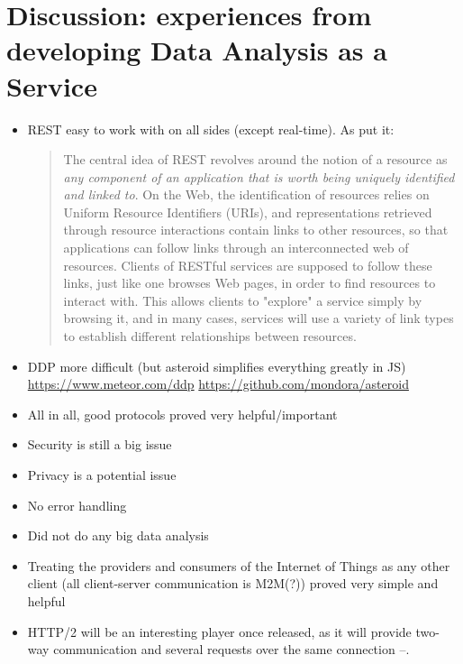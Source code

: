 \section{Discussion: experiences from developing Data Analysis as a Service}
\begin{itemize}
    \item REST easy to work with on all sides (except real-time). As     \textcite{uckelmann-harrison-michahelles:architecting-the-internet-of-things:2011} put it:

    \blockquote{The central idea of REST revolves around the notion of a resource as \textit{any component of an application that is worth being uniquely identified and linked to}. On the Web, the identification of resources relies on Uniform Resource Identifiers (URIs), and representations retrieved through resource interactions contain links to other resources, so that applications can follow links through an interconnected web of resources. Clients of RESTful services are supposed to follow these links, just like one browses Web pages, in order to find resources to interact with. This allows clients to "explore" a service simply by browsing it, and in many cases, services will use a variety of link types to establish different relationships between resources.}

    \item DDP more difficult (but asteroid simplifies everything greatly in JS) \url{https://www.meteor.com/ddp} \url{https://github.com/mondora/asteroid}
    \item All in all, good protocols proved very helpful/important
    \item Security is still a big issue
    \item Privacy is a potential issue
    \item No error handling
    \item Did not do any big data analysis
    \item Treating the providers and consumers of the Internet of Things as any other client (all client-server communication is M2M(?)) proved very simple and helpful
    \item HTTP/2 will be an interesting player once released, as it will provide two-way communication and several requests over the same connection –. 
\end{itemize}